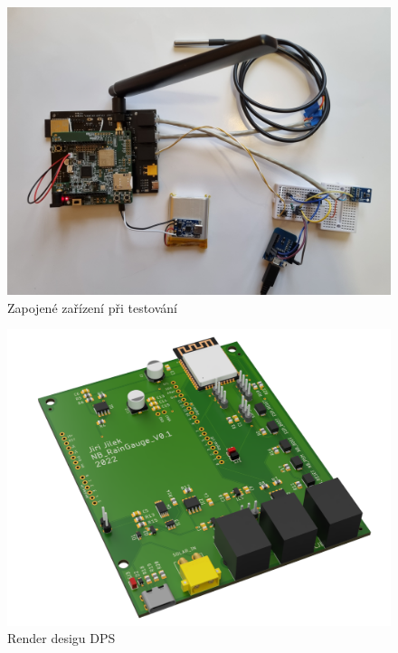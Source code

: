     \begin{figure}[!h]
      \begin{center}
        \includegraphics[scale=0.1]{obrazky/prace/Testing.jpg}
      \end{center}
      \caption[Testování zařízení]{Zapojené zařízení při testování}
      \label{obr:Testing}
    \end{figure}

    \begin{figure}[!h]
      \begin{center}
        \includegraphics[scale=0.2]{obrazky/prace/Render.PNG}
      \end{center}
      \caption[Render designu DPS]{Render desigu DPS}
      \label{obr:Render}
    \end{figure}

